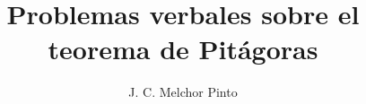 \documentclass[12pt]{guia}
\title{Problemas verbales sobre el teorema de Pitágoras}
\author{J. C. Melchor Pinto}
\begin{document}
\pagestyle{headandfoot}
\addpoints
\INFO
\printanswers

\newpage
\begin{questions}
    
    
    
    
    
    
    
    
    

\end{questions}
\end{document}
